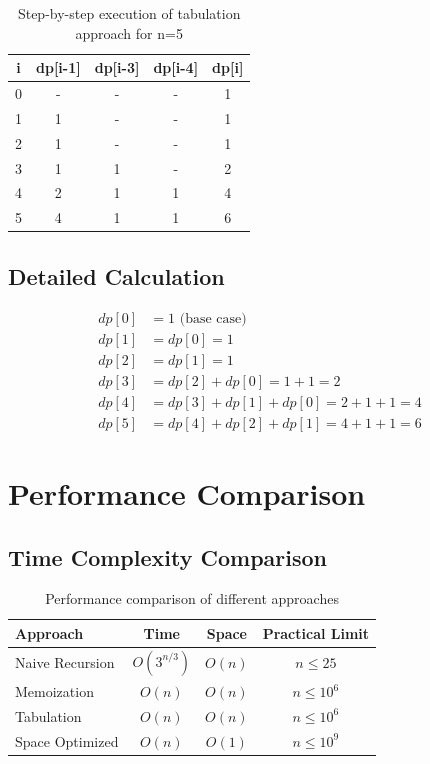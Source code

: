 \documentclass[12pt,a4paper]{article}
\begin{document}
\begin{table}[h]
\centering
\begin{tabular}{|c|c|c|c|c|}
\hline
\textbf{i} & \textbf{dp[i-1]} & \textbf{dp[i-3]} & \textbf{dp[i-4]} & \textbf{dp[i]} \\
\hline
0 & - & - & - & 1 \\
1 & 1 & - & - & 1 \\
2 & 1 & - & - & 1 \\
3 & 1 & 1 & - & 2 \\
4 & 2 & 1 & 1 & 4 \\
5 & 4 & 1 & 1 & 6 \\
\hline
\end{tabular}
\caption{Step-by-step execution of tabulation approach for n=5}
\end{table}

\subsection{Detailed Calculation}
\begin{align}
dp[0] &= 1 \text{ (base case)} \nonumber \\
dp[1] &= dp[0] = 1 \nonumber \\
dp[2] &= dp[1] = 1 \nonumber \\
dp[3] &= dp[2] + dp[0] = 1 + 1 = 2 \nonumber \\
dp[4] &= dp[3] + dp[1] + dp[0] = 2 + 1 + 1 = 4 \nonumber \\
dp[5] &= dp[4] + dp[2] + dp[1] = 4 + 1 + 1 = 6 \nonumber
\end{align}

\section{Performance Comparison}

\subsection{Time Complexity Comparison}

\begin{table}[h]
\centering
\begin{tabular}{|l|c|c|c|}
\hline
\textbf{Approach} & \textbf{Time} & \textbf{Space} & \textbf{Practical Limit} \\
\hline
Naive Recursion & $O(3^{n/3})$ & $O(n)$ & $n \leq 25$ \\
Memoization & $O(n)$ & $O(n)$ & $n \leq 10^6$ \\
Tabulation & $O(n)$ & $O(n)$ & $n \leq 10^6$ \\
Space Optimized & $O(n)$ & $O(1)$ & $n \leq 10^9$ \\
\hline
\end{tabular}
\caption{Performance comparison of different approaches}
\end{table}
\end{document}
